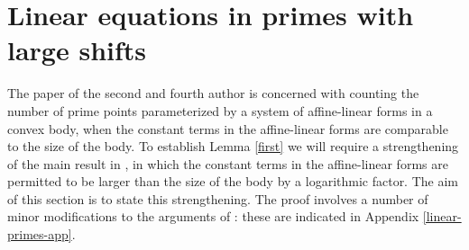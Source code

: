 \documentclass[11pt]{amsart}
\numberwithin{equation}{section}  %
\theoremstyle{remark}
\theoremstyle{plain}
\numberwithin{equation}{section}
\renewcommand{\leq}{\leqslant}
\renewcommand{\(}{\left(}
\renewcommand{\)}{\right)}
\newcommand{\vect}[1]{{\ensuremath{\vec{#1}}}}
\newcommand{\PP}{\mathcal{P}}
\begin{document}
\begin{comment}
Now set
\[ \Sigma := \sum_{i=0}^{r-1}\sum_{q\in R''_2(\vect{\mathbf{a}})}(|\PP_1(q,i;\vect{\mathbf{a}})|-|\PP_2(\vect{\mathbf{a}}) \cap \PP_1(q,i; \vect{\mathbf{a}})|).\]
Unravelling the definitions, $\Sigma$ is counting the number of triples $(i,p,q)$ with $p \in P_0 \setminus P_2(\vect{\mathbf{a}})$, $q \in R''_2(\vect{\mathbf{a}})$, $q - ir! p \in Q_0(p)$ and $q - ir! p,\dots, q + (r - i - 1)r! p \in R'_2(\vect{\mathbf{a}})$. For any such triple we certainly have $q - ir! p \in Q_1(p;\vect{\mathbf{a}})$, and so we have the upper bound
\[ \Sigma \leq r \sum_{p \in P_0 \setminus P_2(\vect{\mathbf{a}})} |Q_1(p;\vect{\mathbf{a}})|.\]
By \eqref{sumoverexceptp}, it follows that
$$\Sigma =
 o\Bigg(\gamma^r\frac{xy}{(\log x)^{r+1}}\bigg),$$ and therefore
\begin{equation}\label{av-a} \sum_{i=0}^{r-1}\big(|\PP_1(q,i;\vect{\mathbf{a}})|-|\PP_2(\vect{\mathbf{a}}) \cap \PP_1(q,i;\vect{\mathbf{a}})|\big) = o\(\gamma^{r-1} \frac{x}{(\log x)^r}\)\end{equation} for all except $o(\gamma y/\log x) = o(x/\log x)$ values of $q \in R''_2(\vect{\mathbf{a}})$. Now \eqref{eq460} and \eqref{av-a} implies the statement \eqref{stronger}, which we are trying to prove, uniformly in $i \in \{0,\dots, r-1\}$. Taking $R''_2$ to consist of the values of $q \in R''_2(\vect{\mathbf{a}})$ for which \eqref{av-a} holds, the proof of Lemma \ref{sieveunited} is complete.
\end{proof}

\end{comment}




\section{Linear equations in primes with large shifts}\label{dickson-shifted-sec}

The paper \cite{gt-linearprimes} of the second and fourth author is concerned with counting the number of prime points parameterized by a system of affine-linear forms in a convex body, when the constant terms in the affine-linear forms are comparable to the size of the body.
To establish Lemma \ref{first} we will require a strengthening of the main result in \cite{gt-linearprimes}, in which the constant terms in the affine-linear forms are permitted to be larger than the size of the body by a logarithmic factor. The aim of this section is to state this strengthening. The proof involves a number of minor modifications to the arguments of \cite{gt-linearprimes}: these are indicated in Appendix \ref{linear-primes-app}.
\end{document}
